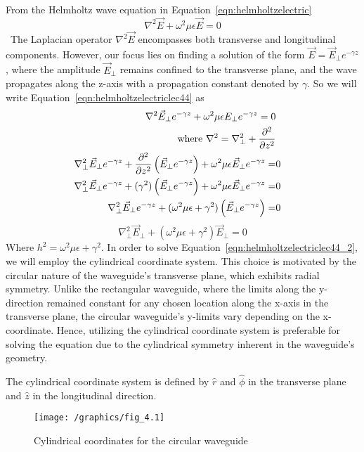 From the Helmholtz wave equation in Equation~\eqref{eqn:helmholtzelectric} 
\begin{equation}
\nabla^2\vec{E} + \omega^2\mu\epsilon\vec{E}=0
\label{eqn:helmholtzelectriclec44}
\end{equation}\
The Laplacian operator $\nabla^2\vec{E}$ encompasses both transverse and longitudinal components. However, our focus lies on finding a solution of the form $\vec{E}=\vec{E}_{\bot}e^{-\gamma z}$, where the amplitude $\vec{E}_\bot$ remains confined to the transverse plane, and the wave propagates along the z-axis with a propagation constant denoted by $\gamma$. So we will write Equation~\ref{eqn:helmholtzelectriclec44} as
\begin{align*}
\nabla^2\vec{E}_\perp e^{-\gamma z} + \omega^2 \mu\epsilon E_\perp e^{-\gamma z} = 0\\\text{where }\nabla^2 = \nabla^2_\perp + \partialderivative[2]{}{z}&\\
\nabla^2_\perp\vec{E}_\perp e^{-\gamma z} + \partialderivative[2]{}{z}\left(\vec{E}_\perp e^{-\gamma z}\right) + \omega^2\mu\epsilon\vec{E}_\perp e^{-\gamma z} =&  0\\
\nabla^2_\perp\vec{E}_\perp e^{-\gamma z} + (\gamma^2)\left(\vec{E}_\perp e^{-\gamma z}\right) + \omega^2\mu\epsilon\vec{E}_\perp e^{-\gamma z} =& 0\\
\nabla^2_\perp\vec{E}_\perp e^{-\gamma z} + (\omega^2\mu\epsilon + \gamma^2)\left(\vec{E}_\perp e^{-\gamma z}\right) =& 0
\end{align*}
\begin{equation}
\nabla^2_\perp\vec{E}_\perp + (\omega^2\mu\epsilon + \gamma^2)\vec{E}_\perp = 0
\label{eqn:helmholtzelectriclec44_2}
\end{equation}
Where $h^2 = \omega^2\mu\epsilon + \gamma^2$. In order to solve Equation~\ref{eqn:helmholtzelectriclec44_2}, we will employ the cylindrical coordinate system. This choice is motivated by the circular nature of the waveguide's transverse plane, which exhibits radial symmetry. Unlike the rectangular waveguide, where the limits along the y-direction remained constant for any chosen location along the x-axis in the transverse plane, the circular waveguide's y-limits vary depending on the x-coordinate. Hence, utilizing the cylindrical coordinate system is preferable for solving the equation due to the cylindrical symmetry inherent in the waveguide's geometry.
 
The cylindrical coordinate system is defined by $\hat{r}$ and $\hat{\phi}$ in the transverse plane and $\hat{z}$ in the longitudinal direction.
\begin{figure}[h]
\centering
\texttt{[image: /graphics/fig\_4.1]}
\caption{Cylindrical coordinates for the circular waveguide}
\label{fig:fig4}
\end{figure}

